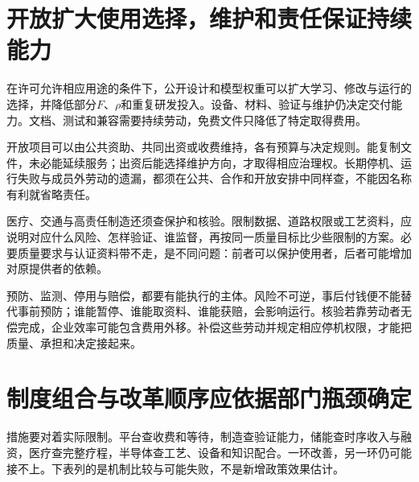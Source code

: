 \documentclass[UTF8,fontset=windows,12pt,a4paper,oneside,openany]{ctexbook}
\begin{document}
\section{开放扩大使用选择，维护和责任保证持续能力}

在许可允许相应用途的条件下，公开设计和模型权重可以扩大学习、修改与运行的选择，并降低部分$F$、$\rho$和重复研发投入。设备、材料、验证与维护仍决定交付能力。文档、测试和兼容需要持续劳动，免费文件只降低了特定取得费用。

开放项目可以由公共资助、共同出资或收费维持，各有预算与决定规则。能复制文件，未必能延续服务；出资后能选择维护方向，才取得相应治理权。长期停机、运行失败与成员外劳动的遗漏，都须在公共、合作和开放安排中同样查，不能因名称有利就省略责任。

医疗、交通与高责任制造还须查保护和核验。限制数据、道路权限或工艺资料，应说明对应什么风险、怎样验证、谁监督，再按同一质量目标比少些限制的方案。必要质量要求与认证资料带不走，是不同问题：前者可以保护使用者，后者可能增加对原提供者的依赖。

预防、监测、停用与赔偿，都要有能执行的主体。风险不可逆，事后付钱便不能替代事前预防；谁能暂停、谁能取资料、谁能获赔，会影响运行。核验若靠劳动者无偿完成，企业效率可能包含费用外移。补偿这些劳动并规定相应停机权限，才能把质量、承担和决定接起来。

\section{制度组合与改革顺序应依据部门瓶颈确定}

措施要对着实际限制。平台查收费和等待，制造查验证能力，储能查时序收入与融资，医疗查完整疗程，半导体查工艺、设备和知识配合。一环改善，另一环仍可能接不上。下表列的是机制比较与可能失败，不是新增政策效果估计。
\end{document}
